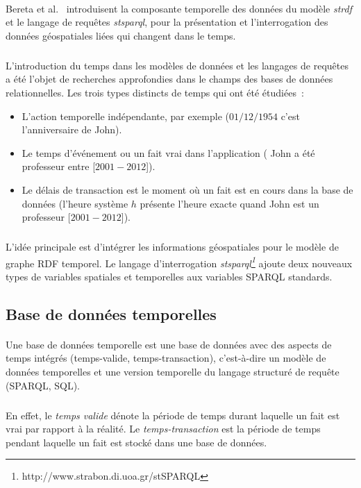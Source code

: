\paragraph{}
Bereta et al.~\cite{bereta2013} introduisent la composante temporelle des données du modèle {\itshape\gls{strdf}} et le langage de requêtes {\itshape\gls{stsparql}}, pour la présentation et l’interrogation des données géospatiales liées qui changent dans le temps.
\subparagraph{}
L’introduction du temps dans les modèles de données et les langages de requêtes a été l’objet de recherches approfondies dans le champs des bases de données relationnelles.
\newline
Les trois types distincts de temps qui ont été étudiées~:
\begin{itemize}
\item L'action temporelle indépendante, par exemple ($01/12/1954$ c’est l’anniversaire de John).
\item Le temps d’événement ou un fait vrai dans l’application ( John a été professeur entre [$2001-2012$]).
\item Le délais de transaction est le moment où un fait est en cours dans la base de données (l’heure système $h$ présente l’heure exacte quand John est un professeur [$2001-2012$]).
\end{itemize}
\subparagraph{}
L’idée principale est d’intégrer les informations géospatiales pour le modèle de graphe RDF temporel. Le langage d’interrogation{ \it \gls{stsparql}\footnote{http://www.strabon.di.uoa.gr/stSPARQL}} ajoute deux nouveaux types de variables spatiales et temporelles aux variables SPARQL standards.
\subsection{Base de données temporelles}
\paragraph{}
Une base de données temporelle est une base de données avec des aspects de temps intégrés (temps-valide, temps-transaction), c'est-à-dire un modèle de données temporelles et une version temporelle du langage structuré de requête (SPARQL, SQL).
\subparagraph{}
En effet, le \textit{temps valide} dénote la période de temps durant laquelle un fait est vrai par rapport à la réalité.
Le \textit{temps-transaction} est la période de temps pendant laquelle un fait est stocké dans une base de données.
